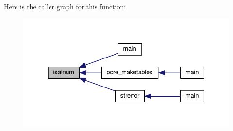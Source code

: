 Here is the caller graph for this function\+:
\nopagebreak
\begin{figure}[H]
\begin{center}
\leavevmode
\includegraphics[width=331pt]{README_8txt_a25d7dd05239df8ce57a8921c43397d07_icgraph}
\end{center}
\end{figure}


